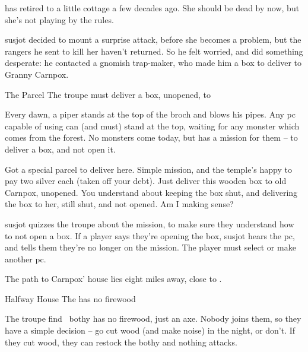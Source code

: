 \documentclass[10pt,twoside]{book}
\begin{document}




 has retired to a little cottage a few decades ago.
She should be dead by now, but she's not playing by the rules.

\Gls{susjot} decided to mount a surprise attack, before she becomes a problem, but the \glspl{ranger} he sent to kill her haven't returned.
So he felt worried, and did something desperate: he contacted a gnomish trap-maker, who made him a box to deliver to Granny Carnpox.

{The Parcel}%
{The troupe must deliver a box, unopened, to }%

\pagestyle{minizine}%

Every dawn, a piper stands at the top of the \gls{broch} and blows his pipes.
Any \gls{pc} capable of using  can (and must) stand at the top, waiting for any \gls{monster} which comes from the forest.
No \glspl{monster} come today, but  has a mission for them -- to deliver a box, and not open it.

\begin{speechtext}
  Got a special parcel to deliver here.
  Simple mission, and the temple's happy to pay two silver each (taken off your debt).
  Just deliver this wooden box to old Carnpox, unopened.
  You understand about keeping the box shut, and delivering the box to her, still shut, and not opened.
  Am I making sense?
\end{speechtext}

\Gls{susjot} quizzes the troupe about the mission, to make sure they understand how to not open a box.
If a player says they're opening the box, \gls{susjot} hears the \gls{pc}, and tells them they're no longer on the mission.
The player must select or make another \gls{pc}.

The path to Carnpox' house lies eight miles away, close to .

{Halfway House}%
{The  has no firewood}%

The troupe find \composeHumanName~\gls{bothy} has no firewood, just an axe.
Nobody joins them, so they have a simple decision -- go cut wood (and make noise) in the night, or don't.
If they cut wood, they can restock the \gls{bothy} and nothing attacks.
\end{document}
